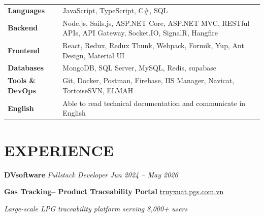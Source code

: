 \documentclass[11pt,a4paper]{article}
\begin{document}
\begin{tabular}{@{}p{4cm} p{12.4cm}}

\textbf{Languages}
&
JavaScript, TypeScript, C\#, SQL
\\[1.5pt]

\textbf{Backend}
&
Node.js, Sails.js, ASP.NET Core, ASP.NET MVC, RESTful APIs, API Gateway, Socket.IO, SignalR, Hangfire
\\[1.5pt]

\textbf{Frontend}
&
React, Redux, Redux Thunk, Webpack, Formik, Yup, Ant Design, Material UI
\\[1.5pt]

\textbf{Databases}
&
MongoDB, SQL Server, MySQL, Redis, supabase
\\[1.5pt]

\textbf{Tools \& DevOps}
&
Git, Docker, Postman, Firebase, IIS Manager, Navicat, TortoiseSVN, ELMAH
\\[1.5pt]


\textbf{English}
&
Able to read technical documentation and communicate in English

\end{tabular}

\section*{EXPERIENCE}

\textbf{\large DVsoftware}
{\color{accent}\textit{Fullstack Developer}}
\hfill
\textit{Jun 2024 -- May 2026}

\vspace{4pt}

\textbf{Gas Tracking-- Product Traceability Portal}
\hfill
{\small\color{muted}\href{https://truyxuat.pgs.com.vn/}{truyxuat.pgs.com.vn}}

{\small\color{muted}\textit{Large-scale LPG traceability platform serving 8,000+ users}}
\end{document}
